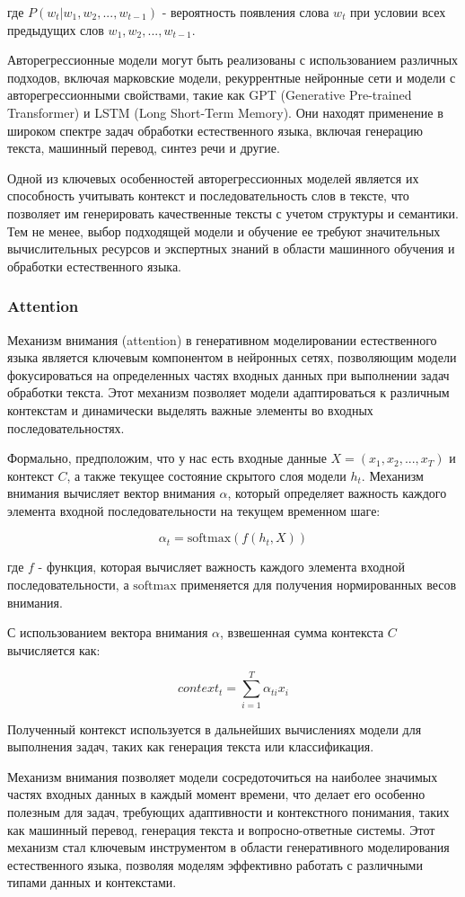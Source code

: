где \( P(w_t|w_1, w_2, ..., w_{t-1}) \) - вероятность появления слова \( w_t \) при условии всех предыдущих слов \( w_1, w_2, ..., w_{t-1} \).

Авторегрессионные модели могут быть реализованы с использованием различных подходов, включая марковские модели, рекуррентные нейронные сети и модели с авторегрессионными свойствами, такие как GPT (Generative Pre-trained Transformer) и LSTM (Long Short-Term Memory). Они находят применение в широком спектре задач обработки естественного языка, включая генерацию текста, машинный перевод, синтез речи и другие.

Одной из ключевых особенностей авторегрессионных моделей является их способность учитывать контекст и последовательность слов в тексте, что позволяет им генерировать качественные тексты с учетом структуры и семантики. Тем не менее, выбор подходящей модели и обучение ее требуют значительных вычислительных ресурсов и экспертных знаний в области машинного обучения и обработки естественного языка.

\subsubsection{Attention}

Механизм внимания (attention) в генеративном моделировании естественного языка является ключевым компонентом в нейронных сетях, позволяющим модели фокусироваться на определенных частях входных данных при выполнении задач обработки текста. Этот механизм позволяет модели адаптироваться к различным контекстам и динамически выделять важные элементы во входных последовательностях.

Формально, предположим, что у нас есть входные данные \( X = (x_1, x_2, ..., x_T) \) и контекст \( C \), а также текущее состояние скрытого слоя модели \( h_t \). Механизм внимания вычисляет вектор внимания \( \alpha \), который определяет важность каждого элемента входной последовательности на текущем временном шаге:

\[ \alpha_t = \text{softmax}(f(h_t, X)) \]

где \( f \) - функция, которая вычисляет важность каждого элемента входной последовательности, а \( \text{softmax} \) применяется для получения нормированных весов внимания.

С использованием вектора внимания \( \alpha \), взвешенная сумма контекста \( C \) вычисляется как:

\[ context_t = \sum_{i=1}^{T} \alpha_{ti} x_i \]

Полученный контекст используется в дальнейших вычислениях модели для выполнения задач, таких как генерация текста или классификация.

Механизм внимания позволяет модели сосредоточиться на наиболее значимых частях входных данных в каждый момент времени, что делает его особенно полезным для задач, требующих адаптивности и контекстного понимания, таких как машинный перевод, генерация текста и вопросно-ответные системы. Этот механизм стал ключевым инструментом в области генеративного моделирования естественного языка, позволяя моделям эффективно работать с различными типами данных и контекстами.

